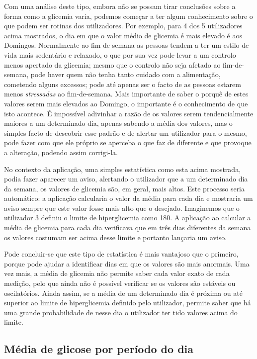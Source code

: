 Com uma análise deste tipo, embora não se possam tirar conclusões sobre a forma como a glicemia varia, podemos começar a ter algum conhecimento sobre o que podem ser rotinas dos utilizadores. Por exemplo, para 4 dos 5 utilizadores acima mostrados, o dia em que o valor médio de glicemia é mais elevado é aos Domingos. Normalmente ao fim-de-semana as pessoas tendem a ter um estilo de vida mais sedentário e relaxado, o que por sua vez pode levar a um controlo menos apertado da glicemia; mesmo que o controlo não seja afetado ao fim-de-semana, pode haver quem não tenha tanto cuidado com a alimentação, cometendo alguns excessos; pode até apenas ser o facto de as pessoas estarem menos \textit{stressadas} ao fim-de-semana. Mais importante de saber o porquê de estes valores serem mais elevados ao Domingo, o importante é o conhecimento de que isto acontece. É impossível adivinhar a razão de os valores serem tendencialmente maiores a um determinado dia, apenas sabendo a média dos valores, mas o simples facto de descobrir esse padrão e de alertar um utilizador para o mesmo, pode fazer com que ele próprio se aperceba o que faz de diferente e que provoque a alteração, podendo assim corrigi-la. 

No contexto da aplicação, uma simples estatística como esta acima mostrada, podia fazer aparecer um aviso, alertando o utilizador que a um determinado dia da semana, os valores de glicemia são, em geral, mais altos. Este processo seria automático: a aplicação calcularia o valor da média para cada dia e mostraria um aviso sempre que este valor fosse mais alto que o desejado. Imaginemos que o utilizador 3 definiu o limite de hiperglicemia como 180. A aplicação ao calcular a média de glicemia para cada dia verificava que em três dias diferentes da semana os valores costumam ser acima desse limite e portanto lançaria um aviso.\newline

Pode concluir-se que este tipo de estatística é mais vantajoso que o primeiro, porque pode ajudar a identificar dias em que os valores são mais anormais. Uma vez mais, a média de glicemia não permite saber cada valor exato de cada medição, pelo que ainda não é possível verificar se os valores são estáveis ou oscilatórios. Ainda assim, se a média de um determinado dia é próxima ou até superior ao limite de hiperglicemia definido pelo utilizador, permite saber que há uma grande probabilidade de nesse dia o utilizador ter tido valores acima do limite.

\subsection{Média de glicose por período do dia}

